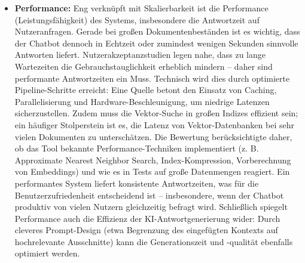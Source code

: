 \begin{itemize}
    \item \textbf{Performance:} Eng verknüpft mit Skalierbarkeit ist die Performance (Leistungsfähigkeit) des Systems, insbesondere die Antwortzeit auf Nutzeranfragen. Gerade bei großen Dokumentenbeständen ist es wichtig, dass der Chatbot dennoch in Echtzeit oder zumindest wenigen Sekunden sinnvolle Antworten liefert. Nutzerakzeptanzstudien legen nahe, dass zu lange Wartezeiten die Gebrauchstauglichkeit erheblich mindern – daher sind performante Antwortzeiten ein Muss. Technisch wird dies durch optimierte Pipeline-Schritte erreicht: Eine Quelle betont den Einsatz von Caching, Parallelisierung und Hardware-Beschleunigung, um niedrige Latenzen sicherzustellen. Zudem muss die Vektor-Suche in großen Indizes effizient sein; ein häufiger Stolperstein ist es, die Latenz von Vektor-Datenbanken bei sehr vielen Dokumenten zu unterschätzen. Die Bewertung berücksichtigte daher, ob das Tool bekannte Performance-Techniken implementiert (z. B. Approximate Nearest Neighbor Search, Index-Kompression, Vorberechnung von Embeddings) und wie es in Tests auf große Datenmengen reagiert. Ein performantes System liefert konsistente Antwortzeiten, was für die Benutzerzufriedenheit entscheidend ist – insbesondere, wenn der Chatbot produktiv von vielen Nutzern gleichzeitig befragt wird. Schließlich spiegelt Performance auch die Effizienz der KI-Antwortgenerierung wider: Durch cleveres Prompt-Design (etwa Begrenzung des eingefügten Kontexts auf hochrelevante Ausschnitte) kann die Generationszeit und -qualität ebenfalls optimiert werden.

\end{itemize}
